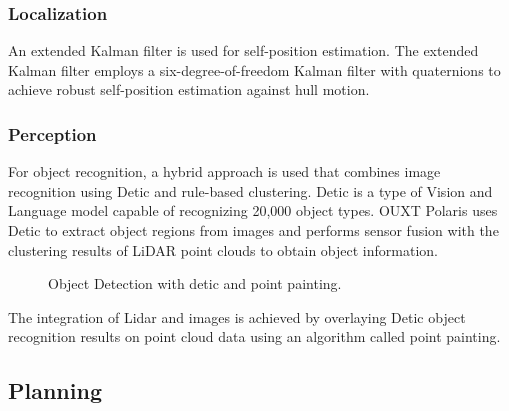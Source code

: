 \documentclass[lettersize,journal]{IEEEtran}
\begin{document}
\subsubsection{Localization}

An extended Kalman filter is used for self-position estimation.
The extended Kalman filter employs a six-degree-of-freedom Kalman filter with quaternions to achieve robust self-position estimation against hull motion.

\subsubsection{Perception}

For object recognition, a hybrid approach is used that combines image recognition using Detic and rule-based clustering.
Detic is a type of Vision and Language model capable of recognizing 20,000 object types.
OUXT Polaris uses Detic to extract object regions from images and performs sensor fusion with the clustering results of LiDAR point clouds to obtain object information.

\begin{figure}[H]
  \begin{center}
  \end{center}
  \caption{Object Detection with detic and point painting.}
  \label{fig:arch_nav}
\end{figure}

The integration of Lidar and images is achieved by overlaying Detic object recognition results on point cloud data using an algorithm called point painting.

\subsection{Planning}
\end{document}
